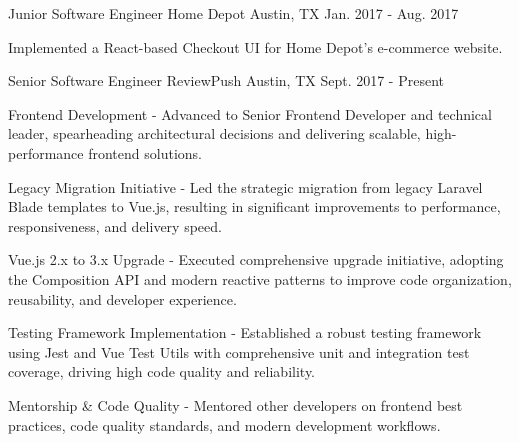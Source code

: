 \begin{cventries}
    \cventry
    {Junior Software Engineer} %
    {Home Depot} %
    {Austin, TX} %
    {Jan. 2017 - Aug. 2017} %
    {
        \vspace{-4mm}
        \begin{cvitems} %
            \item {Implemented a React-based Checkout UI for Home Depot's e-commerce website.}
        \end{cvitems}
    }
    \cventry
    {Senior Software Engineer} %
    {ReviewPush} %
    {Austin, TX} %
    {Sept. 2017 - Present} %
    {
        \vspace{-4mm}
        \begin{cvitems} %
            \item {Frontend Development - Advanced to Senior Frontend Developer and technical leader, spearheading architectural decisions and delivering scalable, high-performance frontend solutions.}
        \end{cvitems}
        \begin{cvsubitems}
            \item {Legacy Migration Initiative - Led the strategic migration from legacy Laravel Blade templates to Vue.js, resulting in significant improvements to performance, responsiveness, and delivery speed.}
            \item {Vue.js 2.x to 3.x Upgrade - Executed comprehensive upgrade initiative, adopting the Composition API and modern reactive patterns to improve code organization, reusability, and developer experience.}
            \item {Testing Framework Implementation - Established a robust testing framework using Jest and Vue Test Utils with comprehensive unit and integration test coverage, driving high code quality and reliability.}
            \item {Mentorship \& Code Quality - Mentored other developers on frontend best practices, code quality standards, and modern development workflows.}

\end{cvsubitems}}
\end{cventries}
